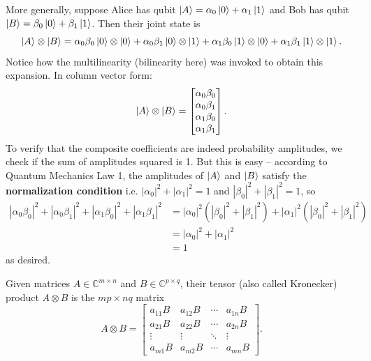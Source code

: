 \begin{example}
    More generally, suppose Alice has qubit $\ket{A} = \alpha_0\ket{0} + \alpha_1\ket{1}$ and Bob has qubit $\ket{B} = \beta_0\ket{0} + \beta_1\ket{1}$. Then their joint state is
    \[
    \ket{A}\otimes\ket{B} = \alpha_0\beta_0 \ket{0}\otimes\ket{0} + \alpha_0\beta_1 \ket{0}\otimes\ket{1} 
    + \alpha_1\beta_0 \ket{1}\otimes\ket{0} + \alpha_1\beta_1 \ket{1}\otimes\ket{1}.
    \]
    Notice how the multilinearity (bilinearity here) was invoked to obtain this expansion. In column vector form:
    \[
    \ket{A}\otimes\ket{B} =
    \begin{bmatrix}
    \alpha_0\beta_0 \\ \alpha_0\beta_1 \\ \alpha_1\beta_0 \\ \alpha_1\beta_1
    \end{bmatrix}.
    \]
    To verify that the composite coefficients are indeed probability amplitudes, we check if the sum of amplitudes squared is 1. But this is easy -- according to Quantum Mechanics Law 1, the amplitudes of $\ket{A}$ and $\ket{B}$ satisfy the \textbf{normalization condition} i.e. $|\alpha_0|^2 + |\alpha_1|^2 = 1$ and $|\beta_0|^2 + |\beta_1|^2 = 1$, so
    \begin{align*}
    |\alpha_0\beta_0|^2 + |\alpha_0\beta_1|^2 + |\alpha_1\beta_0|^2 + |\alpha_1\beta_1|^2
    &= |\alpha_0|^2(|\beta_0|^2 + |\beta_1|^2) + |\alpha_1|^2(|\beta_0|^2 + |\beta_1|^2)\\
    &= |\alpha_0|^2 + |\alpha_1|^2\\
    &= 1
    \end{align*}
    as desired.
\end{example}

\begin{definition}
    Given matrices $A \in \mathbb{C}^{m\times n}$ and $B \in \mathbb{C}^{p\times q}$, their tensor (also called Kronecker) product $A \otimes B$ is the $mp \times nq$ matrix
    \[
    A \otimes B =
    \begin{bmatrix}
    a_{11}B & a_{12}B & \cdots & a_{1n}B \\
    a_{21}B & a_{22}B & \cdots & a_{2n}B \\
    \vdots & \vdots & \ddots & \vdots \\
    a_{m1}B & a_{m2}B & \cdots & a_{mn}B
    \end{bmatrix}.
    \]
\end{definition}

